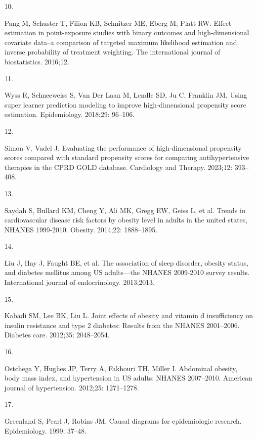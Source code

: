 \documentclass[10pt,letterpaper]{article}
\newlength{\cslhangindent}
\newlength{\csllabelwidth}
\newenvironment{CSLReferences}[2] %
 {\begin{list}{}{%
  \setlength{\itemindent}{0pt}
  \setlength{\leftmargin}{0pt}
  \setlength{\parsep}{0pt}
  \ifodd #1
   \setlength{\leftmargin}{\cslhangindent}
   \setlength{\itemindent}{-1\cslhangindent}
  \fi
  \setlength{\itemsep}{#2\baselineskip}}}
 {\end{list}}
\newcommand{\CSLLeftMargin}[1]{\parbox[t]{\csllabelwidth}{#1}}
\newcommand{\CSLRightInline}[1]{\parbox[t]{\linewidth - \csllabelwidth}{#1}\break}
\begin{document}
\begin{CSLReferences}{0}{1}
\CSLLeftMargin{10. }%
\CSLRightInline{Pang M, Schuster T, Filion KB, Schnitzer ME, Eberg M,
Platt RW. Effect estimation in point-exposure studies with binary
outcomes and high-dimensional covariate data--a comparison of targeted
maximum likelihood estimation and inverse probability of treatment
weighting. The international journal of biostatistics. 2016;12. }

\CSLLeftMargin{11. }%
\CSLRightInline{Wyss R, Schneeweiss S, Van Der Laan M, Lendle SD, Ju C,
Franklin JM. Using super learner prediction modeling to improve
high-dimensional propensity score estimation. Epidemiology. 2018;29:
96--106. }

\CSLLeftMargin{12. }%
\CSLRightInline{Simon V, Vadel J. Evaluating the performance of
high-dimensional propensity scores compared with standard propensity
scores for comparing antihypertensive therapies in the CPRD GOLD
database. Cardiology and Therapy. 2023;12: 393--408. }

\CSLLeftMargin{13. }%
\CSLRightInline{Saydah S, Bullard KM, Cheng Y, Ali MK, Gregg EW, Geiss
L, et al. Trends in cardiovascular disease risk factors by obesity level
in adults in the united states, NHANES 1999-2010. Obesity. 2014;22:
1888--1895. }

\CSLLeftMargin{14. }%
\CSLRightInline{Liu J, Hay J, Faught BE, et al. The association of sleep
disorder, obesity status, and diabetes mellitus among US adults---the
NHANES 2009-2010 survey results. International journal of endocrinology.
2013;2013. }

\CSLLeftMargin{15. }%
\CSLRightInline{Kabadi SM, Lee BK, Liu L. Joint effects of obesity and
vitamin d insufficiency on insulin resistance and type 2 diabetes:
Results from the NHANES 2001--2006. Diabetes care. 2012;35: 2048--2054.
}

\CSLLeftMargin{16. }%
\CSLRightInline{Ostchega Y, Hughes JP, Terry A, Fakhouri TH, Miller I.
Abdominal obesity, body mass index, and hypertension in US adults:
NHANES 2007--2010. American journal of hypertension. 2012;25:
1271--1278. }

\CSLLeftMargin{17. }%
\CSLRightInline{Greenland S, Pearl J, Robins JM. Causal diagrams for
epidemiologic research. Epidemiology. 1999; 37--48. }


\end{CSLReferences}
\end{document}
